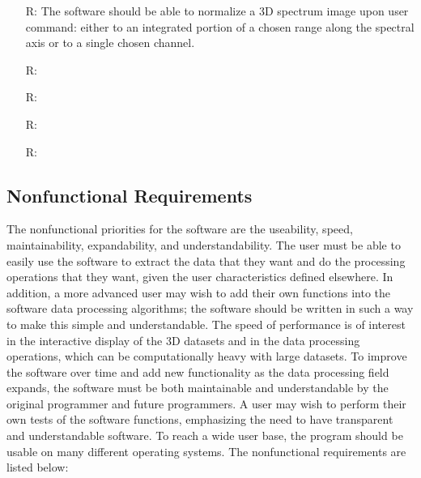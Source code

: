 \documentclass[12pt]{article}
\newcounter{reqnum} %
\begin{document}
\begin{itemize}
\item[R\refstepcounter{reqnum}\thereqnum \label{R_Inputs}:] The software should be able to normalize a 3D spectrum image upon user command: either to an integrated portion of a chosen range along the spectral axis or to a single chosen channel.

\item[R\refstepcounter{reqnum}\thereqnum \label{R_OutputInputs}:] 

\item[R\refstepcounter{reqnum}\thereqnum \label{R_Calculate}:] 

\item[R\refstepcounter{reqnum}\thereqnum \label{R_VerifyOutput}:]

\item[R\refstepcounter{reqnum}\thereqnum \label{R_Output}:] 

\end{itemize}

\subsection{Nonfunctional Requirements}

The nonfunctional priorities for the software are the useability, speed, maintainability, expandability, and understandability. The user must be able to easily use the software to extract the data that they want and do the processing operations that they want, given the user characteristics defined elsewhere. In addition, a more advanced user may wish to add their own functions into the software data processing algorithms; the software should be written in such a way to make this simple and understandable. The speed of performance is of interest in the interactive display of the 3D datasets and in the data processing operations, which can be computationally heavy with large datasets. To improve the software over time and add new functionality as the data processing field expands, the software must be both maintainable and understandable by the original programmer and future programmers. A user may wish to perform their own tests of the software functions, emphasizing the need to have transparent and understandable software. To reach a wide user base, the program should be usable on many different operating systems. The nonfunctional requirements are listed below:
\end{document}
